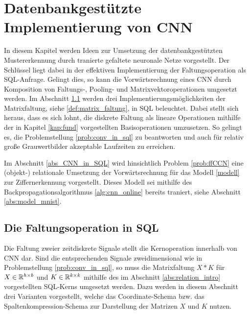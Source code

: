 \chapter{Datenbankgestützte Implementierung von CNN}
\label{kap:CNN_in_SQL}
In diesem Kapitel werden Ideen zur Umsetzung der datenbankgestützten Mustererkennung durch tranierte gefaltete neuronale Netze vorgestellt. Der Schlüssel liegt dabei in der effektiven Implementierung der Faltungsoperation als SQL-Anfrage. Gelingt dies, so kann die Vorwärtsrechnung eines CNN durch Komposition von Faltungs-, Pooling- und Matrixvektoroperationen umgesetzt werden. Im Abschnitt \ref{abs:conv_in_sql} werden drei Implementierungsmöglichkeiten der Matrixfaltung, siehe \ref{def:matrix_faltung}, in SQL beleuchtet. Dabei stellt sich heraus, dass es sich lohnt, die diskrete Faltung als lineare Operationen mithilfe der in Kapitel \ref{kap:fund} vorgestellten Basisoperationen umzusetzen. So gelingt es, die Problemstellung \ref{prob:conv_in_sql} zu beantworten und auch für relativ große Grauwertbilder akzeptable Laufzeiten zu erreichen. 

Im Abschnitt \ref{abs_CNN_in_SQL} wird hinsichtlich Problem \ref{prob:ffCCN} eine (objekt-) relationale Umsetzung der Vorwärtsrechnung für das Modell \ref{modell} zur Ziffernerkennung vorgestellt. Dieses Modell sei mithilfe des Backpropagationsalgorithmus \ref{alg:cnn_online} bereits traniert, siehe Abschnitt \ref{abs:model_mnist}.
\section{Die Faltungsoperation in SQL}
\label{abs:conv_in_sql}
Die Faltung zweier zeitdiskrete Signale stellt die Kernoperation innerhalb von CNN dar. Sind die entsprechenden Signale zweidimensional wie in Problemstellung \ref{prob:conv_in_sql}, so muss die Matrixfaltung $X \ast K$ für $X \in \mathbb{R}^{h \times b}$ und $K \in \mathbb{R}^{k \times k}$ mithilfe des im Abschnitt \ref{abs:relation_intro} vorgestellten SQL-Kerns umgesetzt werden. Dazu werden in diesem Abschnitt drei Varianten vorgestellt, welche das Coordinate-Schema bzw. das Spaltenkompression-Schema zur Darstellung der Matrizen $X$ und $K$ nutzen. 
